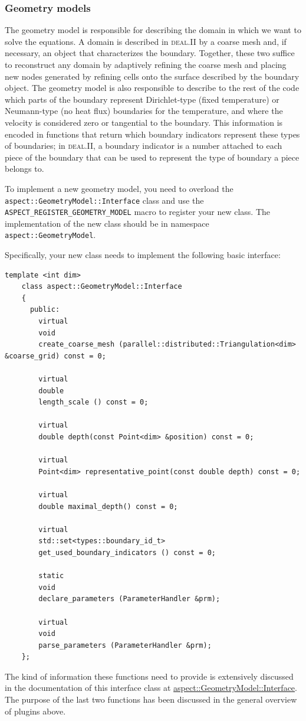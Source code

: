 \documentclass{article}
\newcommand{\dealii}{{\textsc{deal.II}}}
\begin{document}
\subsubsection{Geometry models}
\label{sec:geometry-models}

The geometry model is responsible for describing the domain in which we want
to solve the equations. A domain is described in \dealii{} by a coarse mesh
and, if necessary, an object that characterizes the boundary. Together, these
two suffice to reconstruct any domain by adaptively refining the coarse mesh
and placing new nodes generated by refining cells onto the surface described
by the boundary object. The geometry model is also responsible to describe to
the rest of the code which parts of the boundary represent Dirichlet-type
(fixed temperature) or Neumann-type (no heat flux) boundaries for the
temperature, and where the velocity is considered zero or tangential to the
boundary. This information is encoded in functions that return which boundary
indicators represent these types of boundaries; in \dealii{}, a boundary
indicator is a number attached to each piece of the boundary that can be used
to represent the type of boundary a piece belongs to.

To implement a new geometry model, you
need to overload the \texttt{aspect::GeometryModel::Interface} class and use
the \texttt{ASPECT\_REGISTER\_GEOMETRY\_MODEL} macro to register your new
class. The implementation of the new class should be in namespace
\texttt{aspect::GeometryModel}.

Specifically, your new class needs to implement the following basic interface:
\begin{lstlisting}[frame=single]
    template <int dim>
    class aspect::GeometryModel::Interface
    {
      public:
        virtual
        void
        create_coarse_mesh (parallel::distributed::Triangulation<dim> &coarse_grid) const = 0;

        virtual
        double
        length_scale () const = 0;

        virtual
        double depth(const Point<dim> &position) const = 0;

        virtual
        Point<dim> representative_point(const double depth) const = 0;

        virtual
        double maximal_depth() const = 0;

        virtual
        std::set<types::boundary_id_t>
        get_used_boundary_indicators () const = 0;

        static
        void
        declare_parameters (ParameterHandler &prm);

        virtual
        void
        parse_parameters (ParameterHandler &prm);
    };
\end{lstlisting}
The kind of information these functions need to provide is extensively
discussed in the documentation of this interface class at
\href{doc/doxygen/classaspect_1_1GeometryModel_1_1Interface.html}{aspect::GeometryModel::Interface}.
The purpose of the last two functions has been discussed in the general
overview of plugins above.
\end{document}
